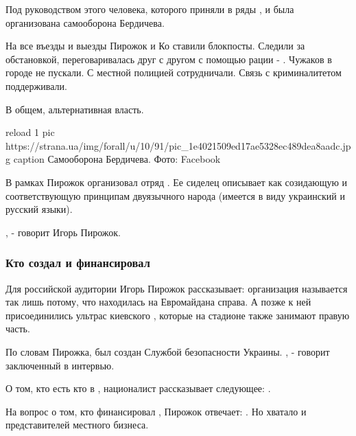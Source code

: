 Под руководством этого человека, которого приняли в ряды , и была организована самооборона Бердичева.

На все въезды и выезды Пирожок и Ко ставили блокпосты. Следили за
обстановкой, переговаривалась друг с другом с помощью рации - . Чужаков в городе не
пускали. С местной полицией сотрудничали. Связь с криминалитетом
поддерживали. 

В общем, альтернативная власть. 

\ifcmt
reload 1
pic https://strana.ua/img/forall/u/10/91/pic_1e4021509ed17ae5328ec489dea8aadc.jpg
caption Самооборона Бердичева. Фото: Facebook
\fi

В рамках  Пирожок организовал отряд . Ее сиделец
описывает как созидающую и соответствующую принципам двуязычного народа
(имеется в виду украинский и русский языки). 

, - говорит Игорь Пирожок. 

\subsubsection{Кто создал и финансировал }

Для российской аудитории Игорь Пирожок рассказывает: организация  называется так лишь потому, что находилась на Евромайдана справа.
А позже к ней присоединились ультрас киевского , которые на
стадионе также занимают правую часть. 

По словам Пирожка,  был создан Службой безопасности
Украины. , - говорит заключенный в интервью. 

О том, кто есть кто в , националист рассказывает
следующее: . 

На вопрос о том, кто финансировал , Пирожок
отвечает: . Но хватало и представителей
местного бизнеса.


